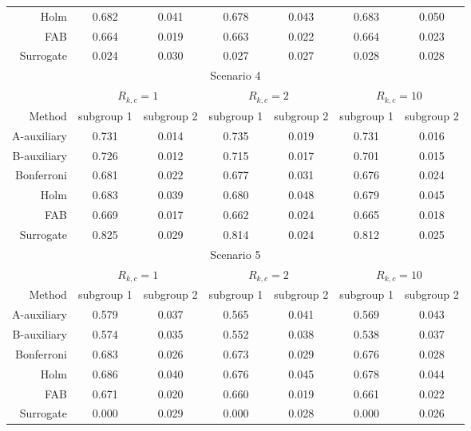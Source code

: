\begin{tabular}{rcccccc}
Holm &0.682 & 0.041 &0.678 & 0.043 &0.683 & 0.050 \\ 
FAB &0.664 & 0.019 &0.663 & 0.022 &0.664 & 0.023 \\ 
Surrogate &0.024 & 0.030 &0.027 & 0.027 &0.028 & 0.028 \\ 
\bottomrule 
\multicolumn{7}{c}{Scenario 4}\\ 
\midrule 
& \multicolumn{2}{c}{$R_{k,c} = 1$} & \multicolumn{2}{c}{$R_{k,c} = 2$} & \multicolumn{2}{c}{$R_{k,c} = 10$} \\ 
Method  & subgroup 1 & subgroup 2 & subgroup 1 & subgroup 2 & subgroup 1 & subgroup 2 \\ 
A-auxiliary &0.731 & 0.014 &0.735 & 0.019 &0.731 & 0.016 \\ 
 B-auxiliary &0.726 & 0.012 &0.715 & 0.017 &0.701 & 0.015 \\ 
 Bonferroni &0.681 & 0.022 &0.677 & 0.031 &0.676 & 0.024 \\ 
Holm &0.683 & 0.039 &0.680 & 0.048 &0.679 & 0.045 \\ 
FAB &0.669 & 0.017 &0.662 & 0.024 &0.665 & 0.018 \\ 
Surrogate &0.825 & 0.029 &0.814 & 0.024 &0.812 & 0.025 \\ 
\bottomrule\multicolumn{7}{c}{Scenario 5}\\ 
\midrule 
& \multicolumn{2}{c}{$R_{k,c} = 1$} & \multicolumn{2}{c}{$R_{k,c} = 2$} & \multicolumn{2}{c}{$R_{k,c} = 10$} \\ 
Method  & subgroup 1 & subgroup 2 & subgroup 1 & subgroup 2 & subgroup 1 & subgroup 2 \\ 
A-auxiliary &0.579 & 0.037 &0.565 & 0.041 &0.569 & 0.043 \\ 
 B-auxiliary &0.574 & 0.035 &0.552 & 0.038 &0.538 & 0.037 \\ 
 Bonferroni &0.683 & 0.026 &0.673 & 0.029 &0.676 & 0.028 \\ 
Holm &0.686 & 0.040 &0.676 & 0.045 &0.678 & 0.044 \\ 
FAB &0.671 & 0.020 &0.660 & 0.019 &0.661 & 0.022 \\ 
Surrogate &0.000 & 0.029 &0.000 & 0.028 &0.000 & 0.026 \\ 
\bottomrule 
\end{tabular}